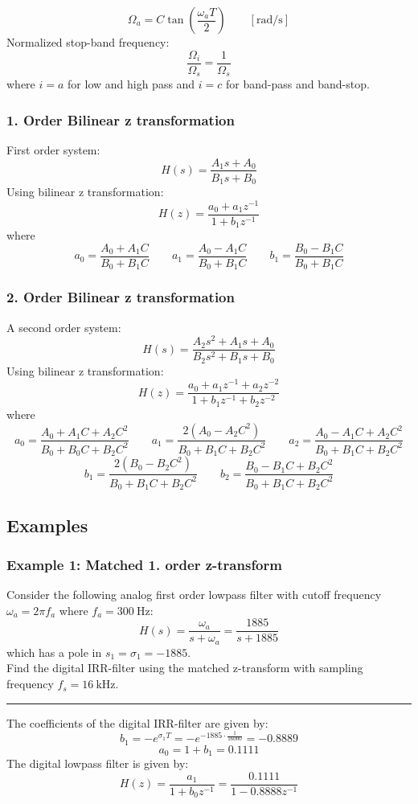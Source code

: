 $$\Omega_a=C\tan\left({\frac{\omega_a T}{2}}\right)\qquad\mathrm{\left[rad/s\right]}$$
Normalized stop-band frequency:
$$\frac{\Omega_i}{\Omega_s}=\frac{1}{\Omega_s}$$
where $i=a$ for low and high pass and $i=c$ for band-pass and band-stop.
\subsubsection{1. Order Bilinear z transformation}
First order system:
$$H(s)=\frac{A_{1}s+A_{0}}{B_{1}s+B_{0}}$$
Using bilinear z transformation:
$$H(z)=\frac{a_0+a_1z^{-1}}{1+b_1z^{-1}}$$
where
$$a_{0}=\frac{A_{0}+A_{1}C}{B_{0}+B_{1}C}\qquad a_{1}=\frac{A_{0}-A_{1}C}{B_{0}+B_{1}C}\qquad b_{1}=\frac{B_{0}-B_{1}C}{B_{0}+B_{1}C}$$
\subsubsection{2. Order Bilinear z transformation}
A second order system:
$$H(s)={\frac{A_{2}s^{2}+A_{1}s+A_{0}}{B_{2}s^{2}+B_{1}s+B_{0}}}$$
Using bilinear z transformation:
$$H(z)={\frac{a_{0}+a_{1}z^{-1}+a_{2}z^{-2}}{1+b_{1}z^{-1}+b_{2}z^{-2}}}$$
where
$$a_{0}=\frac{A_{0}+A_{1}C+A_{2}C^{2}}{B_{0}+B_{0}C+B_{2}C^{2}}\qquad a_{1}=\frac{2(A_{0}-A_{2}C^{2})}{B_{0}+B_{1}C+B_{2}C^{2}}\qquad a_{2}=\frac{A_{0}-A_{1}C+A_{2}C^{2}}{B_{0}+B_{1}C+B_{2}C^{2}}$$
$$b_{1}=\frac{2(B_{0}-B_{2}C^{2})}{B_{0}+B_{1}C+B_{2}C^{2}}\qquad b_{2}=\frac{B_{0}-B_{1}C+B_{2}C^{2}}{B_{0}+B_{1}C+B_{2}C^{2}}$$
\subsection{Examples}
\subsubsection{Example 1: Matched 1. order z-transform}
Consider the following analog first order lowpass filter with cutoff frequency $\omega_a=2\pi f_a$ where $f_a=\SI{300}{\hertz}$:
$$H(s)=\frac{\omega_a}{s+\omega_a}=\frac{1885}{s+1885}$$
which has a pole in $s_1=\sigma_1=-1885$.\\
Find the digital IRR-filter using the matched z-transform with sampling frequency $f_s=\SI{16}{\kilo\hertz}$.

\rule{\textwidth}{0.5pt}

The coefficients of the digital IRR-filter are given by:
$$b_1=-e^{\sigma_1 T}=-e^{-1885\cdot\frac{1}{16000}}=-0.8889$$
$$a_0=1+b_1=0.1111$$
The digital lowpass filter is given by:
$$H(z)=\frac{a_1}{1+b_0z^{-1}}=\frac{0.1111}{1-0.8888z^{-1}}$$

